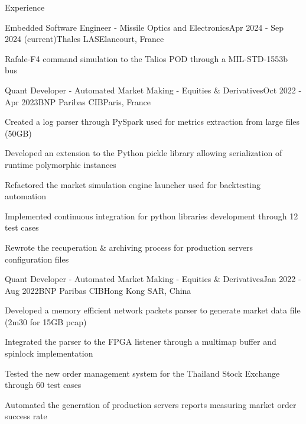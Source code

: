 \documentclass[
	a4paper, %
	10pt, %
]{resume} %
\begin{document}
\begin{rSection}{Experience}

	\begin{rSubsection}{Embedded Software Engineer - Missile Optics and Electronics}{Apr 2024 - Sep 2024 (current)}{Thales LAS}{Elancourt, France}
		\item Rafale-F4 command simulation to the Talios POD through a MIL-STD-1553b bus
	\end{rSubsection}

	\begin{rSubsection}{Quant Developer - Automated Market Making - Equities \& Derivatives}{Oct 2022 - Apr 2023}{BNP Paribas CIB}{Paris, France}
		\item Created a log parser through PySpark used for metrics extraction from large files (50GB)
		\item Developed an extension to the Python pickle library allowing serialization of runtime polymorphic instances
		\item Refactored the market simulation engine launcher used for backtesting automation
		\item Implemented continuous integration for python libraries development through 12 test cases
		\item Rewrote the recuperation \& archiving process for production servers configuration files
	\end{rSubsection}

	\begin{rSubsection}{Quant Developer - Automated Market Making - Equities \& Derivatives}{Jan 2022 - Aug 2022}{BNP Paribas CIB}{Hong Kong SAR, China}
		\item Developed a memory efficient network packets parser to generate market data file (2m30 for 15GB pcap)
		\item Integrated the parser to the FPGA listener through a multimap buffer and spinlock implementation
		\item Tested the new order management system for the Thailand Stock Exchange through 60 test cases
		\item Automated the generation of production servers reports measuring market order success rate
	\end{rSubsection}

\end{rSection}
\end{document}
